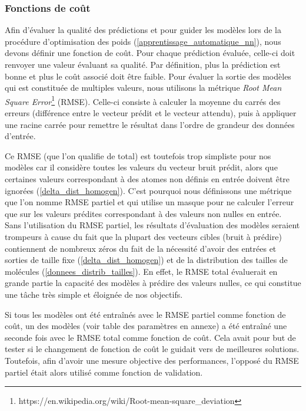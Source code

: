 \label{delta_dist_eval}

\subsubsection{Fonctions de coût}
\label{delta_dist_eval_cout}
\par Afin d'évaluer la qualité des prédictions et pour guider les modèles lors de la procédure d'optimisation des poids (\ref{apprentissage_automatique_nn}), nous devons définir une fonction de coût. Pour chaque prédiction évaluée, celle-ci doit renvoyer une valeur évaluant sa qualité. Par définition, plus la prédiction est bonne et plus le coût associé doit être faible. Pour évaluer la sortie des modèles qui est constituée de multiples valeurs, nous utilisons la métrique \emph{Root Mean Square Error}\footnote{https://en.wikipedia.org/wiki/Root-mean-square\_deviation} (RMSE). Celle-ci consiste à calculer la moyenne du carrés des erreurs (différence entre le vecteur prédit et le vecteur attendu), puis à appliquer une racine carrée pour remettre le résultat dans l'ordre de grandeur des données d'entrée.\\

\par Ce RMSE (que l'on qualifie de total) est toutefois trop simpliste pour nos modèles car il considère toutes les valeurs du vecteur bruit prédit, alors que certaines valeurs correspondant à des atomes non définis en entrée doivent être ignorées (\ref{delta_dist_homogen}). C'est pourquoi nous définissons une métrique que l'on nomme RMSE partiel et qui utilise un masque pour ne calculer l'erreur que sur les valeurs prédites correspondant à des valeurs non nulles en entrée.\\
Sans l'utilisation du RMSE partiel, les résultats d'évaluation des modèles seraient trompeurs à cause du fait que la plupart des vecteurs cibles (bruit à prédire) contiennent de nombreux zéros du fait de la nécessité d'avoir des entrées et sorties de taille fixe (\ref{delta_dist_homogen}) et de la distribution des tailles de molécules (\ref{donnees_distrib_tailles}). En effet, le RMSE total évaluerait en grande partie la capacité des modèles à prédire des valeurs nulles, ce qui constitue une tâche très simple et éloignée de nos objectifs.

\par Si tous les modèles ont été entraînés avec le RMSE partiel comme fonction de coût, un des modèles (voir table des paramètres en annexe) a été entraîné une seconde fois avec le RMSE total comme fonction de coût. Cela avait pour but de tester si le changement de fonction de coût le guidait vers de meilleures solutions. Toutefois, afin d'avoir une mesure objective des performances, l'opposé du RMSE partiel était alors utilisé comme fonction de validation.

